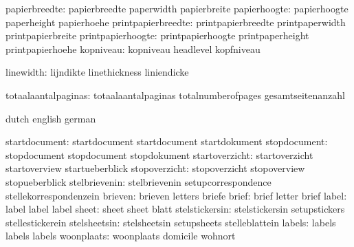                 papierbreedte:  papierbreedte                paperwidth
                                papierbreite
                 papierhoogte:  papierhoogte                 paperheight
                                papierhoehe
           printpapierbreedte:  printpapierbreedte           printpaperwidth
                                printpapierbreite
            printpapierhoogte:  printpapierhoogte            printpaperheight
                                printpapierhoehe
                    kopniveau:  kopniveau                    headlevel
                                kopfniveau

                    linewidth:  lijndikte                    linethickness
                                liniendicke

          totaalaantalpaginas:  totaalaantalpaginas          totalnumberofpages
                                gesamtseitenanzahl

\stopcommands




\startcommands                  dutch                        english
                                german

                startdocument:  startdocument                startdocument
                                startdokument
                 stopdocument:  stopdocument                 stopdocument
                                stopdokument
               startoverzicht:  startoverzicht               startoverview
                                startueberblick
                stopoverzicht:  stopoverzicht                stopoverview
                                stopueberblick
                stelbrievenin:  stelbrievenin                setupcorrespondence
                                stellekorrespondenzein
                      brieven:  brieven                      letters
                                briefe
                        brief:  brief                        letter
                                brief
                        label:  label                        label
                                label
                        sheet:  sheet                        sheet
                                blatt
               stelstickersin:  stelstickersin               setupstickers
                                stellestickerein
                 stelsheetsin:  stelsheetsin                 setupsheets
                                stelleblattein
                       labels:  labels                       labels
                                labels
                   woonplaats:  woonplaats                   domicile
                                wohnort

\stopcommands


\stoplogginginterface

\endinput
